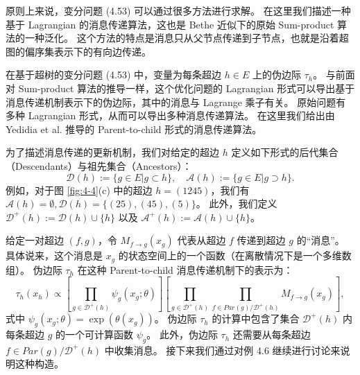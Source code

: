 原则上来说，变分问题 (4.53) 可以通过很多方法进行求解。
在这里我们描述一种基于 Lagrangian 的消息传递算法，这也是 Bethe 近似下的原始 Sum-product 算法的一种泛化。
这个方法的特点是消息只从父节点传递到子节点，也就是沿着超图的偏序集表示下的有向边传递。

在基于超树的变分问题 (4.53) 中，变量为每条超边 $h \in E$ 上的伪边际 $\tau_h$。
与前面对 Sum-product 算法的推导一样，这个优化问题的 Lagrangian 形式可以导出基于消息传递机制表示下的伪边际，其中的消息与 Lagrange 乘子有关。
原始问题有多种 Lagrangian 形式，从而可以导出多种消息传递算法。
在这里我们给出由 Yedidia et al. 推导的 Parent-to-child 形式的消息传递算法。

为了描述消息传递的更新机制，我们对给定的超边 $h$ 定义如下形式的后代集合（Descendants）与祖先集合（Ancestors）：
\begin{equation}
    \mathcal{D}(h) := \{g \in E| g \subset h\}, \quad \mathcal{A}(h) := \{g \in E| g \supset h\}.
\end{equation}
例如，对于图 \ref{fig:4-4}(c) 中的超边 $h = (1245)$，我们有 $\mathcal{A}(h) = \emptyset, \mathcal{D}(h) = \{(25), (45), (5)\}$。
此外，我们定义 $\mathcal{D}^+(h) := \mathcal{D}(h) \cup \{h\}$ 以及 $\mathcal{A}^+(h) := \mathcal{A}(h) \cup \{h\}$。

给定一对超边 $(f, g)$，令 $M_{f \rightarrow g}(x_g)$ 代表从超边 $f$ 传递到超边 $g$ 的“消息”。
具体说来，这个消息是 $x_g$ 的状态空间上的一个函数（在离散情况下是一个多维数组）。
伪边际 $\tau_h$ 在这种 Parent-to-child 消息传递机制下的表示为：
\begin{equation}
    \tau_h(x_h) \propto \left[\prod_{g \in \mathcal{D}^+(h)}\psi_g(x_g; \theta)\right]\left[\prod_{g \in \mathcal{D}^+(h)}\prod_{f \in Par(g)/\mathcal{D}^+(h)}M_{f \rightarrow g}(x_g)\right], 
\end{equation}
式中 $\psi_g(x_g; \theta) = \exp(\theta(x_g))$。
伪边际 $\tau_h$ 的计算中包含了集合 $\mathcal{D}^+(h)$ 内每条超边 $g$ 的一个可计算函数 $\psi_g$。
此外，伪边际 $\tau_h$ 还需要从每条超边 $f \in Par(g)/\mathcal{D}^+(h)$ 中收集消息。
接下来我们通过对例 4.6 继续进行讨论来说明这种构造。

